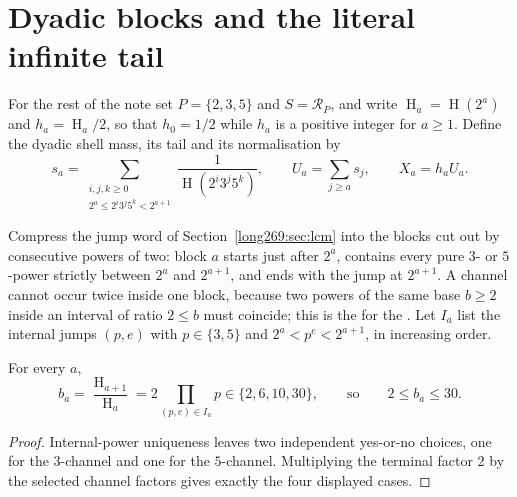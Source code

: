 \documentclass[11pt]{article}
\newcommand{\hgt}{\operatorname{H}}
\begin{document}
\section{Dyadic blocks and the literal infinite tail}\label{long269:sec:blocks}

For the rest of the note set $P=\{2,3,5\}$ and $S=\mathcal R_P$, and write
$\hgt_a=\hgt(2^{a})$ and $h_a=\hgt_a/2$, so that $h_0=1/2$ while $h_a$ is a
positive integer for $a\ge1$.  Define the dyadic shell mass, its tail and its
normalisation by
\begin{equation}\label{long269:eq:actual-tail}
 s_a=\sum_{\substack{i,j,k\ge0\\ 2^{a}\le2^{i}3^{j}5^{k}<2^{a+1}}}
       \frac1{\hgt(2^{i}3^{j}5^{k})},
 \qquad
 U_a=\sum_{j\ge a}s_j,
 \qquad
 X_a=h_aU_a .
\end{equation}

Compress the jump word of Section~\ref{long269:sec:lcm} into the blocks cut out by
consecutive powers of two: block $a$ starts just after $2^{a}$, contains every
pure $3$- or $5$-power strictly between $2^{a}$ and $2^{a+1}$, and ends with
the jump at $2^{a+1}$.  A channel cannot occur twice inside one block, because
two powers of the same base $b\ge2$ inside an interval of ratio $2\le b$ must
coincide; this is the
 for the
.  Let $I_a$ list the internal jumps $(p,e)$
with $p\in\{3,5\}$ and $2^{a}<p^{e}<2^{a+1}$, in increasing order.

\begin{proposition}\label{long269:res:dyadic-alphabet}
For every $a$,
\begin{equation}\label{long269:eq:dyadic-alphabet}
 b_a=\frac{\hgt_{a+1}}{\hgt_a}=2\prod_{(p,e)\in I_a}p\in\{2,6,10,30\},
 \qquad\text{so}\qquad 2\le b_a\le30 .
\end{equation}
\end{proposition}

\begin{proof}
Internal-power uniqueness leaves two independent yes-or-no choices, one for the
$3$-channel and one for the $5$-channel.  Multiplying the terminal factor $2$
by the selected channel factors gives exactly the four displayed cases.
\end{proof}
\end{document}
